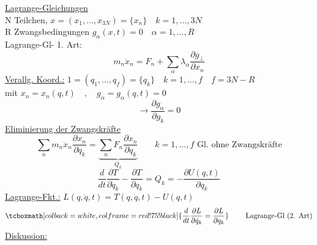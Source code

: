 \documentclass[titlepage,12pt,a4paper,ngerman]{report}
\newcommand{\tx}[1]{\textrm{#1}}
\newcommand{\ub}[1]{\underbrace{#1}}
\newcommand{\rmbox}[1]{\tcboxmath[colback=white,colframe=red!75!black]{#1}} %
\renewcommand{\boxed}{\rmbox}
\begin{document}


\underline{Lagrange-Gleichungen}\\
N Teilchen, $ x = (x_1,\dots,x_{3N}) = \{x_n\}\quad k = 1, \dots , 3N $\\
R Zwangsbedingungen $ g_\alpha (x,t) = 0 \quad \alpha = 1, \dots , R $\\
Lagrange-Gl- 1. Art: 
$$m_n \ddot{x}_n = F_n + \sum_\alpha \lambda_\alpha \frac{\partial g_\perp}{\partial x_n}$$
\underline{Verallg. Koord.:} $ 1 = (q_1,\dots,q_f) = \{ q_k\} \quad k = 1,\dots,f \quad f = 3N - R $\\
mit $ x_n = x_n (q,t) \quad , \quad g_\alpha = g_\alpha(q,t) = 0 $
$$ \rightarrow \frac{\partial g_\alpha}{\partial g_k} = 0 $$
\underline{Eliminierung der Zwangskräfte}
$$\sum_n m_n \ddot{x}_n \frac{\partial x_n}{\partial q_k} = \ub{\sum_n F_n \frac{\partial x_n}{\partial q_k}}_{Q_k} \qquad k = 1, \dots , f \tx{ Gl. ohne Zwangskräfte} $$
$$ \frac{d}{dt} \frac{\partial T}{\partial \dot{q}_k} - \frac{\partial T}{\partial q_k} = Q_k = - \frac{\partial U(q,t)}{\partial q_k}$$
\underline{Lagrange-Fkt.:} $ L(q,\dot{q},t) = T( q, \dot{q},t ) - U(q,t) $
$$ \boxed{\frac{d}{dt} \frac{\partial L}{\partial \dot{q}_k} = \frac{\partial L}{\partial q_k}} \qquad \tx{ Lagrange-Gl (2. Art)}$$
\underline{Diskussion:}\\
\end{document}
